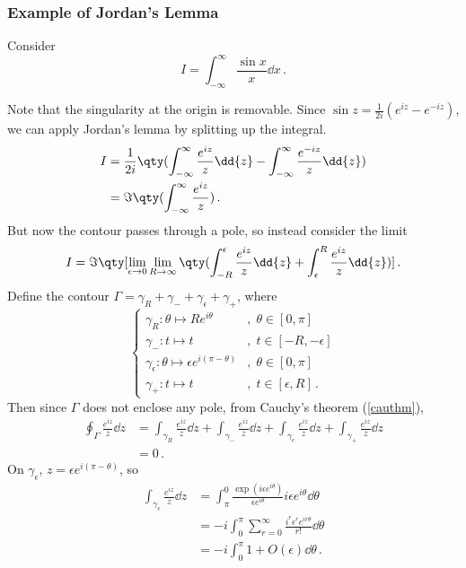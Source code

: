 \documentclass{article}
\theoremstyle{plain}\theoremheaderfont{\normalfont\itshape}\theorembodyfont{\rmfamily}\theoremseparator{.}\newtheorem*{rem}{Remark}\newtheorem*{ex}{Example}\newtheorem*{proof}{Proof}\newtheorem*{altp}{Alternative proof}
\theoremstyle{plain}\theoremheaderfont{\normalfont\bfseries}\theorembodyfont{\rmfamily}\theoremseparator{.}\newtheorem{thm}{Theorem}[section]\newtheorem{lem}[thm]{Lemma}\newtheorem{prop}[thm]{Proposition}\newtheorem*{cor}{Corollary}\newtheorem{defn}[thm]{Definition}\newtheorem{clm}[thm]{Claim}\newtheorem{clminproof}{Claim}
\theoremstyle{break}\theoremheaderfont{\normalfont\itshape}\theorembodyfont{\rmfamily}\theoremseparator{.\medskip}\newtheorem*{proofskip}{Proof}\newtheorem*{exs}{Examples}\newtheorem*{rems}{Remarks}
\theoremstyle{break}\theoremheaderfont{\normalfont\bfseries}\theorembodyfont{\rmfamily}\theoremseparator{.\medskip}\newtheorem{lemskip}[thm]{Lemma}\newtheorem{defnskip}[thm]{Definition}\newtheorem{propskip}[thm]{Proposition}\newtheorem{thmskip}[thm]{Theorem}
\numberwithin{equation}{section}
\begin{document}
	\subsubsection{Example of Jordan's Lemma}
	Consider
	\[I=\int_{-\infty}^{\infty}\frac{\sin x}{x}\dd{x}\,.\]

	Note that the singularity at the origin is removable. Since \(\sin z=\frac{1}{2i}(e^{iz}-e^{-iz})\), we can apply Jordan's lemma by splitting up the integral.
	\begin{align*}
		I&=\frac{1}{2i}\qty(\int_{-\infty}^{\infty}\frac{e^{iz}}{z}\dd{z}-\int_{-\infty}^{\infty}\frac{e^{-iz}}{z}\dd{z})\\
		&=\Im\qty(\int_{-\infty}^{\infty}\frac{e^{iz}}{z})\,.
	\end{align*}
	But now the contour passes through a pole, so instead consider the limit
	\begin{align*}
		I=\Im\qty[\lim_{\epsilon\to 0}\lim_{R\to\infty}\qty(\int_{-R}^{\epsilon}\frac{e^{iz}}{z}\dd{z}+\int_{\epsilon}^{R}\frac{e^{iz}}{z}\dd{z})]\,.
	\end{align*}
	Define the contour \(\Gamma=\gamma_R+\gamma_-+\gamma_\epsilon+\gamma_+\), where
	\[\begin{cases}
		\gamma_R:\theta\mapsto Re^{i\theta} &,\;\theta\in[0,\pi]\\
		\gamma_-:t\mapsto t &,\;t\in[-R,-\epsilon]\\
		\gamma_\epsilon:\theta\mapsto\epsilon e^{i(\pi-\theta)} &,\;\theta\in[0,\pi]\\
		\gamma_+:t\mapsto t &,\;t\in[\epsilon,R]\,.
	\end{cases}\]
	Then since \(\Gamma\) does not enclose any pole, from Cauchy's theorem (\cref{cauthm}),
	\begin{align*}
		\oint_\Gamma\frac{e^{iz}}{z}\dd{z}&=\int_{\gamma_R}\frac{e^{iz}}{z}\dd{z}+\int_{\gamma_-}\frac{e^{iz}}{z}\dd{z}+\int_{\gamma_\epsilon}\frac{e^{iz}}{z}\dd{z}+\int_{\gamma_+}\frac{e^{iz}}{z}\dd{z}\\
		&=0\,.
	\end{align*}
	On \(\gamma_\epsilon\), \(z=\epsilon e^{i(\pi-\theta)}\), so
	\begin{align*}
		\int_{\gamma_\epsilon}\frac{e^{iz}}{z}\dd{z}&=\int_{\pi}^{0}\frac{\exp(i\epsilon e^{i\theta})}{\epsilon e^{i\theta}}i\epsilon e^{i\theta}\dd{\theta}\\
		&=-i\int_{0}^{\pi}\sum_{r=0}^{\infty}\frac{i^r\epsilon^r e^{ir\theta}}{r !}\dd{\theta}\\
		&=-i\int_{0}^{\pi}1+O(\epsilon)\dd\theta\,.
	\end{align*}
\end{document}

